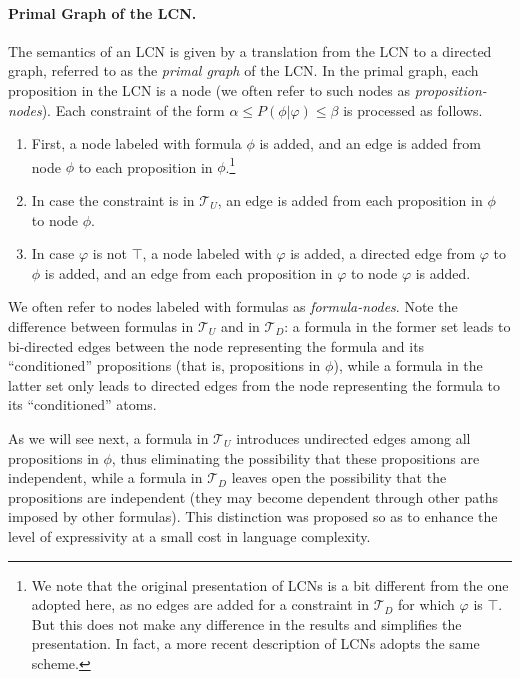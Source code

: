 \documentclass{article}
\begin{document}
\paragraph{Primal Graph of the LCN.} The semantics of an LCN is given by a translation from the LCN to a directed graph, referred to as the {\em primal graph} of the LCN. In the primal graph, each proposition in the LCN is a node  (we often refer to such nodes as {\em proposition-nodes}). Each constraint of the form $\alpha \leq P(\phi|\varphi) \leq \beta$ is processed as follows.

\begin{enumerate}
    \item First, a node labeled with formula $\phi$ is added, and an edge is added from node $\phi$ to each proposition in $\phi$.\footnote{We note that the original presentation of LCNs \cite{marinescu2022neurips} is a bit different from the one adopted here, as  no edges are added for a constraint in $\mathcal{T}_D$ for which $\varphi$ is $\top$. But this does not make any difference in the results and simplifies  the presentation. In fact, a more recent description of LCNs \cite{marinescu2023lcn} adopts the same scheme.}
    \item In case the constraint is in $\mathcal{T}_U$, an edge is added from each proposition in $\phi$ to node $\phi$.
    \item In case $\varphi$ is not $\top$, a node labeled with $\varphi$ is added, a directed edge from $\varphi$ to $\phi$ is added, and an edge from each proposition in $\varphi$ to node $\varphi$ is added.
\end{enumerate}

We often refer  to nodes labeled with formulas as {\em formula-nodes}. Note the difference between formulas in $\mathcal{T}_U$ and in $\mathcal{T}_D$: a formula in the former set leads to bi-directed edges between the node representing the formula and its ``conditioned'' propositions (that is, propositions in $\phi$), while a formula in the latter set only leads to directed edges from the node representing the formula to its ``conditioned'' atoms. 

As we will see next, a formula in $\mathcal{T}_U$ introduces undirected edges among all propositions in $\phi$, thus eliminating the possibility that these propositions are independent, while a formula in $\mathcal{T}_D$ leaves open the possibility that the propositions are independent (they may become dependent through other paths imposed by other formulas). This distinction was proposed so as to enhance the level of expressivity at a small cost in language complexity. 
\end{document}
